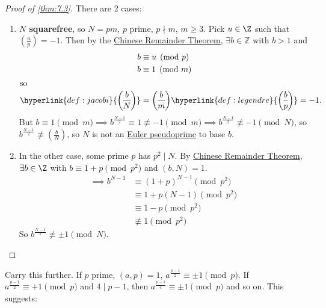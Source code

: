 \documentclass{article}
\newcommand{\legendre}[2]{\genfrac{(}{)}{}{}{#1}{#2}}
\begin{document}
\begin{proof}[Proof of \cref{thm:7.3}]
    There are 2 cases:
    \begin{enumerate}[label=\alph*.]
        \item \textbf{$N$ squarefree}, so $N = pm$, $p$ prime, $p \nmid m$, $m \geq 3$.
            Pick $u \in \Z$ such that $\legendre{u}{p} = -1$.
            Then by the \hyperlink{thm:crt}{Chinese Remainder Theorem}, $\exists b \in \mathbb{Z}$ with $b > 1$ and
            \begin{align*}
                b &\equiv u \pmod{p} \\
                b &\equiv 1 \pmod{m} \\
                \shortintertext{so}
                \hyperlink{def:jacobi}{\legendre{b}{N}} &= \legendre{b}{m} \hyperlink{def:legendre}{\legendre{b}{p}} = -1.
            \end{align*}
            But $b \equiv 1 \pmod{m} \implies b^{\frac{N-1}{2}} \equiv 1 \not\equiv -1 \pmod{m} \implies b^{\frac{N-1}{2}} \not\equiv -1 \pmod{N}$, so $b^{\frac{N-1}{2}} \not\equiv \legendre{b}{N}$, so $N$ is not an \hyperlink{def:ePseudo}{Euler pseudoprime} to base $b$.
        \item In the other case, some prime $p$ has $p^2 \mid N$.
            By \hyperlink{thm:crt}{Chinese Remainder Theorem}, $\exists b \in \Z$ with $b \equiv 1 + p \pmod{p^2}$ and $(b, N) = 1$.
            \begin{align*}
                \implies b^{N-1} &\equiv (1+p)^{N-1} \pmod{p^2} \\
                                 &\equiv 1 + p(N-1) \pmod{p^2} \\
                                 &\equiv 1 - p \pmod{p^2} \\
                                 &\not\equiv 1 \pmod{p^2}
            \end{align*}
            So $b^{\frac{N-1}{2}} \not \equiv \pm 1 \pmod{N}$. \qedhere
    \end{enumerate}
\end{proof}

Carry this further. If $p$ prime, $(a, p) = 1$, $a^{\frac{p-1}{2}} \equiv \pm 1 \pmod{p}$.
If $a^{\frac{p-1}{2}} \equiv +1 \pmod{p}$ and $4 \mid p-1$, then $a^{\frac{p-1}{4}} \equiv \pm 1 \pmod{p}$ and so on.
This suggests:
\end{document}
